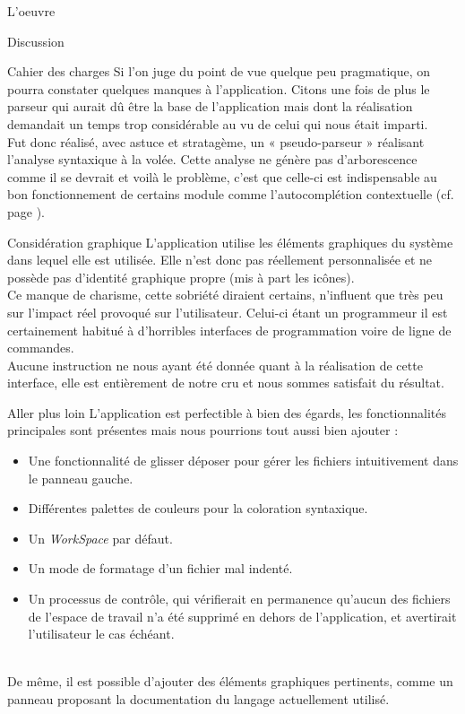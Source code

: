 \documentclass[a4paper, 12pt]{report}
\begin{document}
\begin{part}{L'oeuvre}
\begin{chapter}{Discussion}
\begin{section}{Cahier des charges}
				Si l'on juge du point de vue quelque peu pragmatique, on pourra constater quelques manques à l'application.
				Citons une fois de plus le \gls{parseur} qui aurait dû être la base de l'application mais dont la réalisation demandait
				un temps trop considérable au vu de	celui qui nous était imparti.\\
				Fut donc réalisé, avec astuce et stratagème, un « pseudo-parseur » réalisant l'analyse syntaxique à la volée. Cette analyse ne génère
				pas d'arborescence comme il se devrait et voilà le problème, c'est que celle-ci est indispensable au bon fonctionnement de certains
				module comme l'\gls{autocomplétion} contextuelle (cf. page \pageref{autocompl}).\\
			\end{section}

			\begin{section}{Considération graphique}
				L'application utilise les éléments graphiques du système dans lequel elle est utilisée. Elle n'est donc pas réellement personnalisée
				et ne possède pas d'identité graphique propre (mis à part les icônes).\\
				Ce manque de charisme, cette sobriété diraient certains, n'influent que très peu sur l'impact réel provoqué sur l'utilisateur.
				Celui-ci étant un programmeur il est certainement habitué à d'horribles interfaces de programmation voire de ligne de commandes.\\


				Aucune instruction ne nous ayant été donnée quant à la réalisation de cette interface, elle est entièrement de notre cru et
				nous sommes satisfait du résultat.
			\end{section}

			\begin{section}{Aller plus loin}
				L'application est perfectible à bien des égards, les fonctionnalités principales sont présentes mais nous pourrions tout aussi
				bien ajouter :
				\begin{itemize}
					\item Une fonctionnalité de glisser déposer pour gérer les fichiers intuitivement dans le panneau gauche.
					\item Différentes palettes de couleurs pour la coloration syntaxique.
					\item Un \emph{WorkSpace} par défaut.
					\item Un mode de formatage d'un fichier mal indenté.
					\item Un processus de contrôle, qui vérifierait en permanence qu'aucun des fichiers de l'espace de travail n'a 
					été supprimé en dehors de l'application, et avertirait l'utilisateur le cas échéant.
				\end{itemize}~\\

				De même, il est possible d'ajouter des éléments graphiques pertinents, comme un panneau proposant la documentation du langage
				actuellement utilisé.\\
			\end{section}
		\end{chapter}
	\end{part}
\end{document}
